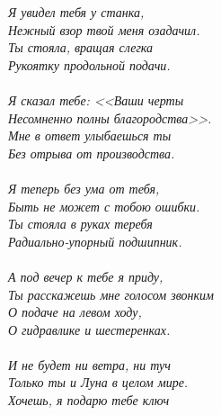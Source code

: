 \vspace{1.0cm}
\noindent\textit{%
\hspace*{2.7cm}Я увидел тебя у станка,\\
\hspace*{2.7cm}Нежный взор твой меня озадачил.\\
\hspace*{2.7cm}Ты стояла, вращая слегка\\
\hspace*{2.7cm}Рукоятку продольной подачи.\\
\\
\hspace*{2.7cm}Я сказал тебе: <<Ваши черты\\
\hspace*{2.7cm}Несомненно полны благородства>>.\\
\hspace*{2.7cm}Мне в ответ улыбаешься ты\\
\hspace*{2.7cm}Без отрыва от производства.\\
\\
\hspace*{2.7cm}Я теперь без ума от тебя,\\
\hspace*{2.7cm}Быть не может с тобою ошибки.\\
\hspace*{2.7cm}Ты стояла в руках теребя\\
\hspace*{2.7cm}Радиально-упорный подшипник.\\
\\
\hspace*{2.7cm}А под вечер к тебе я приду,\\
\hspace*{2.7cm}Ты расскажешь мне голосом звонким\\
\hspace*{2.7cm}О подаче на левом ходу,\\
\hspace*{2.7cm}О гидравлике и шестеренках.\\
\\
\hspace*{2.7cm}И не будет ни ветра, ни туч\mdash\\
\hspace*{2.7cm}Только ты и Луна в целом мире.\\
\hspace*{2.7cm}Хочешь, я подарю тебе ключ\\
}
